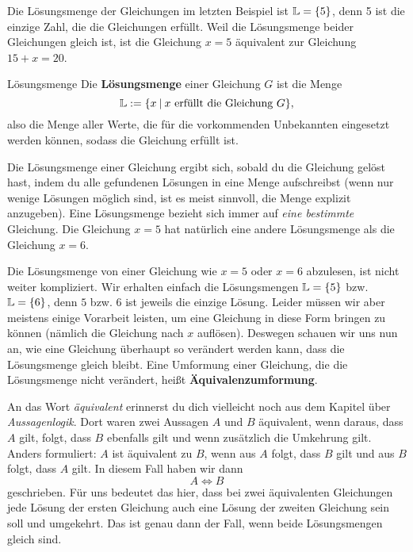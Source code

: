 \documentclass[../../main.tex]{subfiles}
\begin{document}
\begin{example}
    Die Lösungsmenge der Gleichungen im letzten Beispiel ist $\mathbb{L}=\{5\}$, denn 5 ist die einzige Zahl, die die Gleichungen erfüllt. Weil die Lösungsmenge beider Gleichungen gleich ist, ist die Gleichung $x=5$ äquivalent zur Gleichung $15+x=20$.
\end{example}

\begin{definition}{Lösungsmenge}
    Die \textbf{Lösungsmenge} einer Gleichung $G$ ist die Menge 
    \[\mathbb{L}:=\{x\:|\:x~\text{erfüllt die Gleichung~}G\},\]
    also die Menge aller Werte, die für die vorkommenden Unbekannten eingesetzt werden können, sodass die Gleichung erfüllt ist.
\end{definition}

Die Lösungsmenge einer Gleichung ergibt sich, sobald du die Gleichung gelöst hast, indem du alle gefundenen Lösungen in eine Menge aufschreibst (wenn nur wenige Lösungen möglich sind, ist es meist sinnvoll, die Menge explizit anzugeben). Eine Lösungsmenge bezieht sich immer auf \emph{eine bestimmte} Gleichung. Die Gleichung $x=5$ hat natürlich eine andere Lösungsmenge als die Gleichung $x=6$.

Die Lösungsmenge von einer Gleichung wie $x=5$ oder $x=6$ abzulesen, ist nicht weiter kompliziert. Wir erhalten einfach die Lösungsmengen $\mathbb{L}=\{5\}$ bzw. $\mathbb{L}=\{6\}$, denn $5$ bzw. $6$ ist jeweils die einzige Lösung. Leider müssen wir aber meistens einige Vorarbeit leisten, um eine Gleichung in diese Form bringen zu können (nämlich die Gleichung nach $x$ auflösen). Deswegen schauen wir uns nun an, wie eine Gleichung überhaupt so verändert werden kann, dass die Lösungsmenge gleich bleibt. Eine Umformung einer Gleichung, die die Lösungsmenge nicht verändert, heißt \textbf{Äquivalenzumformung}.

An das Wort \emph{äquivalent} erinnerst du dich vielleicht noch aus dem Kapitel über \emph{Aussagenlogik}. Dort waren zwei Aussagen $A$ und $B$ äquivalent, wenn daraus, dass $A$ gilt, folgt, dass $B$ ebenfalls gilt und wenn zusätzlich die Umkehrung gilt. Anders formuliert: $A$ ist äquivalent zu $B$, wenn aus $A$ folgt, dass $B$ gilt und aus $B$ folgt, dass $A$ gilt. In diesem Fall haben wir dann
\[A\Leftrightarrow B\]
geschrieben. Für uns bedeutet das hier, dass bei zwei äquivalenten Gleichungen jede Lösung der ersten Gleichung auch eine Lösung der zweiten Gleichung sein soll und umgekehrt. Das ist genau dann der Fall, wenn beide Lösungsmengen gleich sind.
\end{document}
